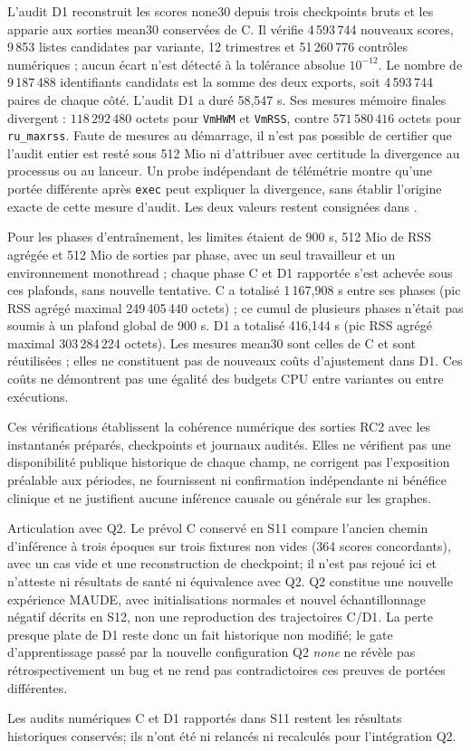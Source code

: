 L'audit D1 reconstruit les scores none30 depuis trois checkpoints bruts et les apparie aux sorties mean30 conservées de C. Il vérifie 4\,593\,744 nouveaux scores, 9\,853 listes candidates par variante, 12 trimestres et 51\,260\,776 contrôles numériques ; aucun écart n'est détecté à la tolérance absolue $10^{-12}$. Le nombre de 9\,187\,488 identifiants candidats est la somme des deux exports, soit 4\,593\,744 paires de chaque côté. L'audit D1 a duré 58,547 s. Ses mesures mémoire finales divergent : $118\,292\,480$ octets pour \texttt{VmHWM} et \texttt{VmRSS}, contre $571\,580\,416$ octets pour \texttt{ru\_maxrss}. Faute de mesures au démarrage, il n'est pas possible de certifier que l'audit entier est resté sous 512 Mio ni d'attribuer avec certitude la divergence au processus ou au lanceur. Un probe indépendant de télémétrie montre qu'une portée différente après \texttt{exec} peut expliquer la divergence, sans établir l'origine exacte de cette mesure d'audit. Les deux valeurs restent consignées dans .

Pour les phases d'entraînement, les limites étaient de 900 s, 512 Mio de RSS agrégée et 512 Mio de sorties par phase, avec un seul travailleur et un environnement monothread ; chaque phase C et D1 rapportée s'est achevée sous ces plafonds, sans nouvelle tentative. C a totalisé 1\,167,908 s entre ses phases (pic RSS agrégé maximal 249\,405\,440 octets) ; ce cumul de plusieurs phases n'était pas soumis à un plafond global de 900 s. D1 a totalisé 416,144 s (pic RSS agrégé maximal 303\,284\,224 octets). Les mesures mean30 sont celles de C et sont réutilisées ; elles ne constituent pas de nouveaux coûts d'ajustement dans D1. Ces coûts ne démontrent pas une égalité des budgets CPU entre variantes ou entre exécutions.

Ces vérifications établissent la cohérence numérique des sorties RC2 avec les instantanés préparés, checkpoints et journaux audités. Elles ne vérifient pas une disponibilité publique historique de chaque champ, ne corrigent pas l'exposition préalable aux périodes, ne fournissent ni confirmation indépendante ni bénéfice clinique et ne justifient aucune inférence causale ou générale sur les graphes.

Articulation avec Q2. Le prévol C conservé en S11 compare l'ancien chemin d'inférence à trois époques sur trois fixtures non vides (364 scores concordants), avec un cas vide et une reconstruction de checkpoint; il n'est pas rejoué ici et n'atteste ni résultats de santé ni équivalence avec Q2. Q2 constitue une nouvelle expérience MAUDE, avec initialisations normales et nouvel échantillonnage négatif décrits en S12, non une reproduction des trajectoires C/D1. La perte presque plate de D1 reste donc un fait historique non modifié; le gate d'apprentissage passé par la nouvelle configuration Q2 \emph{none} ne révèle pas rétrospectivement un bug et ne rend pas contradictoires ces preuves de portées différentes.

Les audits numériques C et D1 rapportés dans S11 restent les résultats historiques conservés; ils n'ont été ni relancés ni recalculés pour l'intégration Q2.
